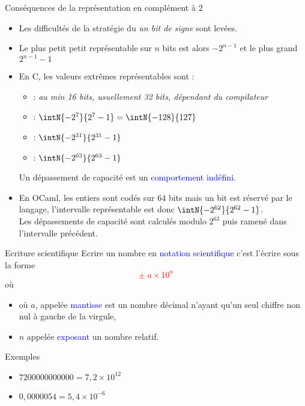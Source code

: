 \documentclass[10pt]{beamer}
\begin{document}
\begin{frame}{\Ctitle}{\stitle}
    \begin{block}{Conséquences de la représentation en complément à 2}
        \begin{itemize}
            \item<1-> Les difficultés de la stratégie du \textit{un bit de signe} sont levées.
            \item<2-> Le plus petit petit représentable sur $n$ bits est alors $-2^{n-1}$ et le plus grand $2^{n-1}-1$
            \item<3-> En C, les valeurs extrêmes représentables sont :
            \begin{itemize}
            \item<4->  : \textit{au min 16 bits, usuellement 32 bits, dépendant du compilateur}
            \item<5->  : $\intN{-2^7}{2^7-1} = \intN{-128}{127}$
            \item<6->   : $\intN{-2^{31}}{2^{31}-1}$ 
            \item<7->   : $\intN{-2^{63}}{2^{63}-1}$ 
            \end{itemize}
             \textcolor{red}{\danger} Un dépassement de capacité est un \textcolor{blue}{comportement indéfini}.
            \item<9-> En OCaml, les entiers sont codés sur 64 bits mais un bit est réservé par le langage, l'intervalle représentable est donc $\intN{-2^{62}}{2^{62}-1}$.\\ 
             Les dépassements de capacité sont calculés modulo  $2^{63}$ puis ramené dans l'intervalle précédent.
        \end{itemize}
    \end{block}
\end{frame}

\begin{frame}{\Ctitle}{\stitle}
    \begin{block}{\textcolor{gray}{\rappel} Ecriture scientifique}
Ecrire un nombre en \textcolor{blue}{notation scientifique} c'est l'écrire sous la forme 
\textcolor{red}{$$\boxed{\pm \; a \times 10^n}$$}
où
\begin{itemize}
    \item<3-> où $a$, appelée \textcolor{blue}{mantisse} est un nombre décimal n'ayant qu'un seul chiffre non nul à gauche de la virgule,
    \item<4-> $n$ appelée \textcolor{blue}{exposant} un nombre  relatif.
\end{itemize}
    \end{block}
    \begin{exampleblock}{Exemples}
        \begin{itemize}
       \item<5-> $7200000000000 = 7,2 \times 10^{12}$
       \item<6-> $0,0000054 = 5,4 \times 10^{-6}$
        \end{itemize}
    \end{exampleblock}
\end{frame}
\end{document}
